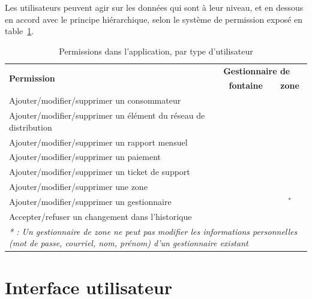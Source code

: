 \documentclass{EPL-master-thesis-covers-FR}
\newcommand{\cmark}{\ding{51}}%
\newcommand{\xmark}{\ding{55}}%
\begin{document}
				Les utilisateurs peuvent agir sur les données qui sont à leur niveau, et en dessous en accord avec le principe hiérarchique, selon le système de permission exposé en table~\ref{tab:permissions}.
				\begin{table}[H]
					\centering
					\small
					\setlength\tabcolsep{2pt}
					\begin{tabular}{|l|c|c|}
						\hline
						\multirow{2}{*}{\textbf{Permission}} & \multicolumn{2}{l|}{\textbf{Gestionnaire de}} \\ \cline{2-3}
						 & \textbf{fontaine} & \textbf{zone} \\ \hline
						 Ajouter/modifier/supprimer un consommateur & \cmark & \cmark \\ \hline
						 Ajouter/modifier/supprimer un élément du réseau de distribution & \cmark & \cmark \\ \hline
						 Ajouter/modifier/supprimer un rapport mensuel & \cmark & \cmark \\ \hline
						 Ajouter/modifier/supprimer un paiement & \cmark & \cmark \\ \hline
						 Ajouter/modifier/supprimer un ticket de support & \cmark & \cmark \\ \hline
						 Ajouter/modifier/supprimer une zone & \xmark & \cmark \\ \hline
						 Ajouter/modifier/supprimer un gestionnaire & \xmark & \cmark$^{*}$ \\ \hline
						 Accepter/refuser un changement dans l'historique & \xmark & \cmark \\ \hline
						 \multicolumn{3}{p{\textwidth}}{\emph{* : Un gestionnaire de zone ne peut pas modifier les informations personnelles (mot de passe, courriel, nom, prénom) d'un gestionnaire existant}} \\
					\end{tabular}
					\caption{Permissions dans l'application, par type d'utilisateur}
					\label{tab:permissions}
				\end{table}



		\section{Interface utilisateur}
\end{document}
